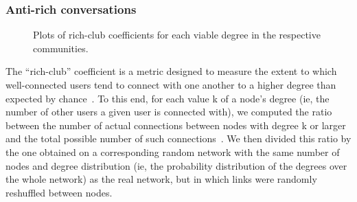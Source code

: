 \subsubsection{Anti-rich conversations}
\label{sec:richclub}
\begin{figure}[!ht]
    \centering
    \caption{ Plots of rich-club coefficients for each viable degree in the respective communities. }
\end{figure}
The “rich-club” coefficient is a metric designed to measure the extent to which well-connected users tend to connect with one another to a higher degree than expected by chance~\cite{colizza2006detecting}. To this end, for each value k of a node’s degree (ie, the number of other users a given user is connected with), we computed the ratio between the number of actual connections between nodes with degree k or larger and the total possible number of such connections~\cite{opsahl2008prominence}. We then divided this ratio by the one obtained on a corresponding random network with the same number of nodes and degree distribution (ie, the probability distribution of the degrees over the whole network) as the real network, but in which links were randomly reshuffled between nodes. 

